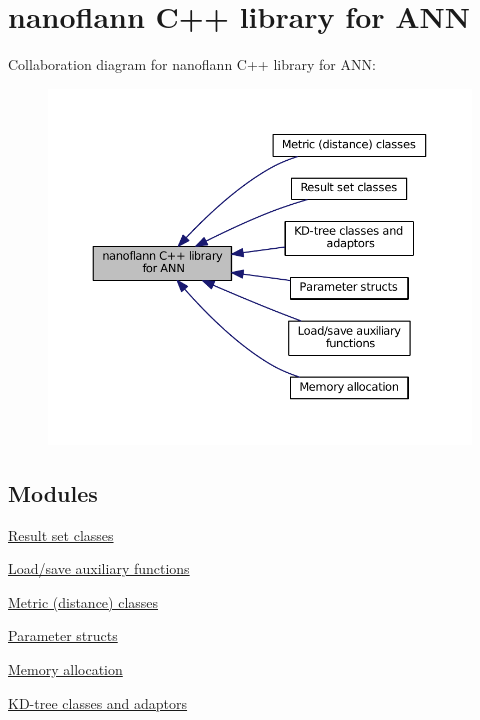 \hypertarget{group__nanoflann__grp}{\section{nanoflann C++ library for A\-N\-N}
\label{group__nanoflann__grp}
}
Collaboration diagram for nanoflann C++ library for A\-N\-N\-:
\nopagebreak
\begin{figure}[H]
\begin{center}
\leavevmode
\includegraphics[width=350pt]{group__nanoflann__grp}
\end{center}
\end{figure}
\subsection*{Modules}
\begin{DoxyCompactItemize}
\item 
\hyperlink{group__result__sets__grp}{Result set classes}
\item 
\hyperlink{group__loadsave__grp}{Load/save auxiliary functions}
\item 
\hyperlink{group__metric__grp}{Metric (distance) classes}
\item 
\hyperlink{group__param__grp}{Parameter structs}
\item 
\hyperlink{group__memalloc__grp}{Memory allocation}
\item 
\hyperlink{group__kdtrees__grp}{K\-D-\/tree classes and adaptors}
\end{DoxyCompactItemize}
